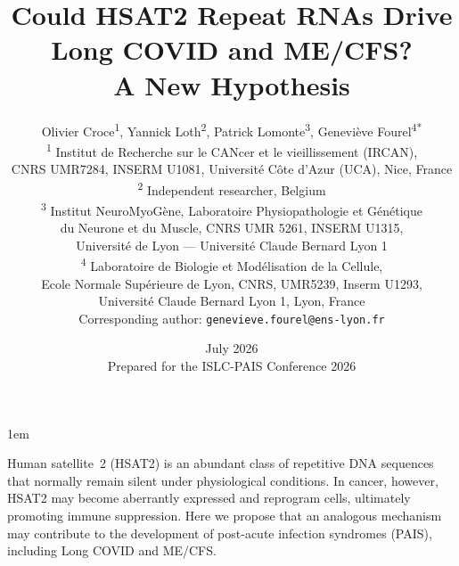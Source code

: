 \documentclass[11pt,a4paper]{scrartcl}
\begin{document}
\emergencystretch 1em

\title{Could HSAT2 Repeat RNAs Drive Long COVID and ME/CFS?\\[4pt]
       A New Hypothesis}
\author{%
  \begin{minipage}[t]{0.95\textwidth}
    \centering
    Olivier Croce\textsuperscript{1},
    Yannick Loth\textsuperscript{2},
    Patrick Lomonte\textsuperscript{3},
    Genevi\`{e}ve Fourel\textsuperscript{4*}\\[4pt]
    \small
    \textsuperscript{1} Institut de Recherche sur le CANcer et le vieillissement (IRCAN),\\
    \hspace*{1.2em} CNRS UMR7284, INSERM U1081, Universit\'e C\^ote d'Azur (UCA), Nice, France\\
    \textsuperscript{2} Independent researcher, Belgium\\
    \textsuperscript{3} Institut NeuroMyoG\`ene, Laboratoire Physiopathologie et G\'en\'etique\\
    \hspace*{1.2em} du Neurone et du Muscle, CNRS UMR 5261, INSERM U1315,\\
    \hspace*{1.2em} Universit\'e de Lyon --- Universit\'e Claude Bernard Lyon 1\\
    \textsuperscript{4} Laboratoire de Biologie et Mod\'elisation de la Cellule,\\
    \hspace*{1.2em} Ecole Normale Sup\'erieure de Lyon, CNRS, UMR5239, Inserm U1293,\\
    \hspace*{1.2em} Universit\'e Claude Bernard Lyon 1, Lyon, France\\[0.5em]
    \small *Corresponding author: \texttt{genevieve.fourel@ens-lyon.fr}
  \end{minipage}%
}
\date{July 2026 \\ \vspace{0.5em} \small Prepared for the ISLC-PAIS Conference 2026}
\maketitle


Human satellite~2 (HSAT2) is an abundant class of repetitive DNA
sequences that normally remain silent under physiological conditions.
In cancer, however, HSAT2 may become aberrantly expressed and
reprogram cells, ultimately promoting immune suppression. Here we
propose that an analogous mechanism may contribute to the
development of post-acute infection syndromes (PAIS), including Long
COVID and ME/CFS.
\end{document}
